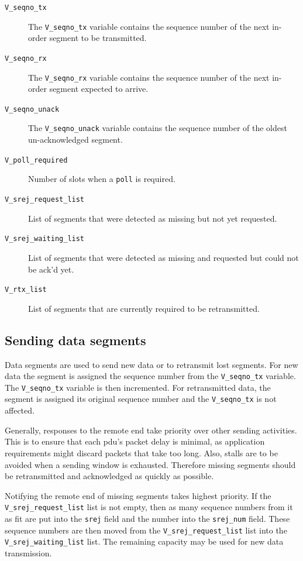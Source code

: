 \documentclass[a4paper]{article}
\newcommand{\poll}{\texttt{poll}}
\newcommand{\srej}{\texttt{srej}}
\newcommand{\srejnum}{\texttt{srej\_{}num}}
\newcommand{\vr}{\texttt{V\_{}seqno\_{}rx}}
\newcommand{\vs}{\texttt{V\_{}seqno\_{}tx}}
\newcommand{\va}{\texttt{V\_{}seqno\_{}unack}}
\newcommand{\pr}{\texttt{V\_{}poll\_{}required}}
\newcommand{\srejr}{\texttt{V\_{}srej\_{}request\_{}list}}
\newcommand{\srejw}{\texttt{V\_{}srej\_{}waiting\_{}list}}
\newcommand{\rtx}{\texttt{V\_{}rtx\_{}list}}
\begin{document}
		\begin{description}
			\item[\vs{}] The \vs{} variable contains the sequence number of the next in-order segment to be transmitted.
			
			\item[\vr{}] The \vr{} variable contains the sequence number of the next in-order segment expected to arrive.
			
			
			\item[\va{}] The \va{} variable contains the sequence number of the oldest un-acknowledged segment.
			
			\item[\pr{}] Number of slots when a \poll{} is required.
			
			\item[\srejr{}] List of segments that were detected as missing but not yet requested.
			
			\item[\srejw{}] List of segments that were detected as missing and requested but could not be \ac{ack}'d yet.
			
			\item[\rtx{}] List of segments that are currently required to be retransmitted.
		\end{description}
		
	\subsection{Sending data segments}\label{sec:arq_sending}
		Data segments are used to send new data or to retransmit lost segments.
		For new data the segment is assigned the sequence number from the \vs{} variable.
		The \vs{} variable is then incremented.
		For retransmitted data, the segment is assigned its original sequence number and the \vs{} is not affected.
		
		Generally, responses to the remote end take priority over other sending activities.
		This is to ensure that each \ac{pdu}'s packet delay is minimal, as application requirements might discard packets that take too long.
		Also, stalls are to be avoided when a sending window is exhausted.
		Therefore missing segments should be retransmitted and acknowledged as quickly as possible.
		
		Notifying the remote end of missing segments takes highest priority.
		If the \srejr{} list is not empty, then as many sequence numbers from it as fit are put into the \srej{} field and the number into the \srejnum{} field.
		These sequence numbers are then moved from the \srejr{} list into the \srejw{} list.
		The remaining capacity may be used for new data transmission.
		
\end{document}
